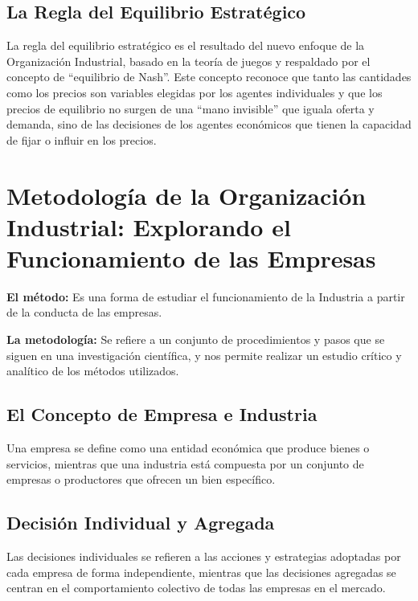 \documentclass[
  doc,
  floatsintext,
  longtable,
  a4paper,
  nolmodern,
  notxfonts,
  notimes,
  colorlinks=true,linkcolor=blue,citecolor=blue,urlcolor=blue]{apa7}
\begin{document}
\subsection{La Regla del Equilibrio
Estratégico}\label{la-regla-del-equilibrio-estratuxe9gico}

La regla del equilibrio estratégico es el resultado del nuevo enfoque de
la Organización Industrial, basado en la teoría de juegos y respaldado
por el concepto de ``equilibrio de Nash''. Este concepto reconoce que
tanto las cantidades como los precios son variables elegidas por los
agentes individuales y que los precios de equilibrio no surgen de una
``mano invisible'' que iguala oferta y demanda, sino de las decisiones
de los agentes económicos que tienen la capacidad de fijar o influir en
los precios.

\section{Metodología de la Organización Industrial: Explorando el
Funcionamiento de las
Empresas}\label{metodologuxeda-de-la-organizaciuxf3n-industrial-explorando-el-funcionamiento-de-las-empresas}

\textbf{El método:} Es una forma de estudiar el funcionamiento de la
Industria a partir de la conducta de las empresas.

\textbf{La metodología:} Se refiere a un conjunto de procedimientos y
pasos que se siguen en una investigación científica, y nos permite
realizar un estudio crítico y analítico de los métodos utilizados.

\subsection{El Concepto de Empresa e
Industria}\label{el-concepto-de-empresa-e-industria}

Una empresa se define como una entidad económica que produce bienes o
servicios, mientras que una industria está compuesta por un conjunto de
empresas o productores que ofrecen un bien específico.

\subsection{Decisión Individual y
Agregada}\label{decisiuxf3n-individual-y-agregada}

Las decisiones individuales se refieren a las acciones y estrategias
adoptadas por cada empresa de forma independiente, mientras que las
decisiones agregadas se centran en el comportamiento colectivo de todas
las empresas en el mercado.
\end{document}

